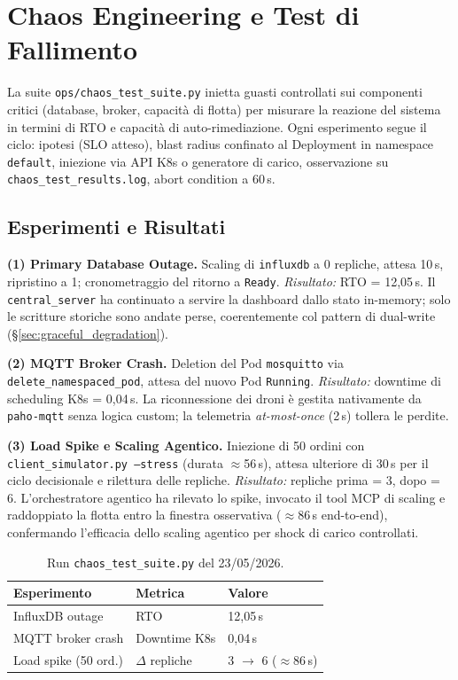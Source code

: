 
\chapter{Chaos Engineering e Test di Fallimento}
\label{cap:chaos_engineering}

La suite \texttt{ops/chaos\_test\_suite.py} inietta guasti controllati sui componenti critici (database, broker, capacità di flotta) per misurare la reazione del sistema in termini di RTO e capacità di auto-rimediazione. Ogni esperimento segue il ciclo: ipotesi (SLO atteso), blast radius confinato al Deployment in namespace \texttt{default}, iniezione via API K8s o generatore di carico, osservazione su \texttt{chaos\_test\_results.log}, abort condition a 60\,s.

\section{Esperimenti e Risultati}
\label{sec:esperimenti_chaos}

\textbf{(1) Primary Database Outage.} Scaling di \texttt{influxdb} a 0 repliche, attesa 10\,s, ripristino a 1; cronometraggio del ritorno a \texttt{Ready}. \textit{Risultato:} RTO = 12{,}05\,s. Il \texttt{central\_server} ha continuato a servire la dashboard dallo stato in-memory; solo le scritture storiche sono andate perse, coerentemente col pattern di dual-write (§\ref{sec:graceful_degradation}).

\textbf{(2) MQTT Broker Crash.} Deletion del Pod \texttt{mosquitto} via \texttt{delete\_namespaced\_pod}, attesa del nuovo Pod \texttt{Running}. \textit{Risultato:} downtime di scheduling K8s = 0{,}04\,s. La riconnessione dei droni è gestita nativamente da \texttt{paho-mqtt} senza logica custom; la telemetria \textit{at-most-once} (2\,s) tollera le perdite.

\textbf{(3) Load Spike e Scaling Agentico.} Iniezione di 50 ordini con \texttt{client\_simulator.py --stress} (durata $\approx$56\,s), attesa ulteriore di 30\,s per il ciclo decisionale e rilettura delle repliche. \textit{Risultato:} repliche prima = 3, dopo = 6. L'orchestratore agentico ha rilevato lo spike, invocato il tool MCP di scaling e raddoppiato la flotta entro la finestra osservativa ($\approx$86\,s end-to-end), confermando l'efficacia dello scaling agentico per shock di carico controllati.

\begin{table}[ht]
\centering
\begin{tabular}{lll}
\toprule
\textbf{Esperimento} & \textbf{Metrica} & \textbf{Valore} \\
\midrule
InfluxDB outage      & RTO          & 12{,}05\,s \\
MQTT broker crash    & Downtime K8s & 0{,}04\,s \\
Load spike (50 ord.) & $\Delta$ repliche & 3 $\rightarrow$ 6 ($\approx$86\,s) \\
\bottomrule
\end{tabular}
\caption{Run \texttt{chaos\_test\_suite.py} del 23/05/2026.}
\label{tab:chaos_results}
\end{table}

